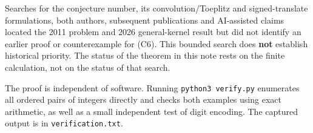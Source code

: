 \documentclass[11pt]{article}
\begin{document}
Searches for the conjecture number, its convolution/Toeplitz and signed-translate formulations, both authors, subsequent publications and AI-assisted claims located the 2011 problem and 2026 general-kernel result but did not identify an earlier proof or counterexample for (C6). This bounded search does \textbf{not} establish historical priority. The status of the theorem in this note rests on the finite calculation, not on the status of that search.

The proof is independent of software. Running \texttt{python3\ verify.py} enumerates all ordered pairs of integers directly and checks both examples using exact arithmetic, as well as a small independent test of digit encoding. The captured output is in \texttt{verification.txt}.
\end{document}
